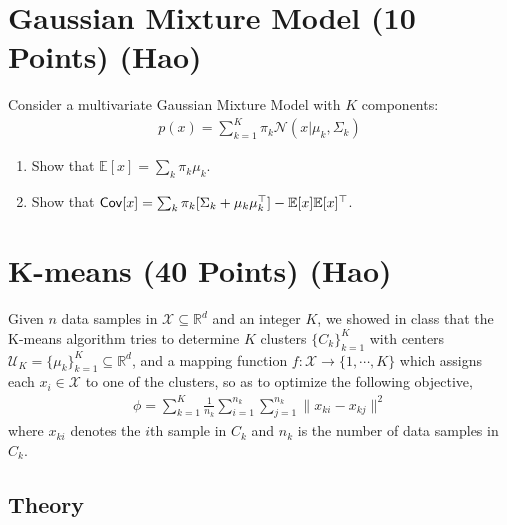 \section{Gaussian Mixture Model (10 Points) (Hao)}
Consider a multivariate Gaussian Mixture Model with $K$ components:
\begin{align}
p(x) = \sum_{k=1}^{K} \pi_k \mathcal{N} (x | \mu_k, \Sigma_k)
\end{align}
\begin{enumerate}
\item Show that 
$
\mathbb{E}[x] = \sum_{k} \pi_k \mu_k
$.

\item Show that
$
\mathsf{Cov} [x] = \sum_{k} \pi_k [\Sigma_k + \mu_k \mu_k^\top] - \mathbb{E}[x] \mathbb{E}[x]^\top
$.

\end{enumerate}

\section{K-means (40 Points) (Hao)}

Given $n$ data samples in $\mathcal{X} \subseteq  \mathbb{R}^d$ and an integer $K$, we showed in class that the K-means algorithm tries to determine $K$ clusters $\{C_k\}_{k=1}^K$ with centers $\mathcal{U}_K = \{\mu_k\}_{k=1}^K \subseteq \mathbb{R}^d$, and a mapping function $f: \mathcal{X} \rightarrow \{1, \cdots, K\}$ which assigns each $x_i \in \mathcal{X}$ to one of the clusters, so as to optimize the following objective,
\begin{align}
\label{eq:obj1}
\phi = \sum_{k=1}^K \frac{1}{n_k} \sum_{i=1}^{n_k} \sum_{j=1}^{n_k} \| x_{ki} - x_{kj}\|^2
\end{align}
where $x_{ki}$ denotes the $i$th sample in $C_k$ and $n_k$ is the number of data samples in $C_k$.

\subsection{Theory}

